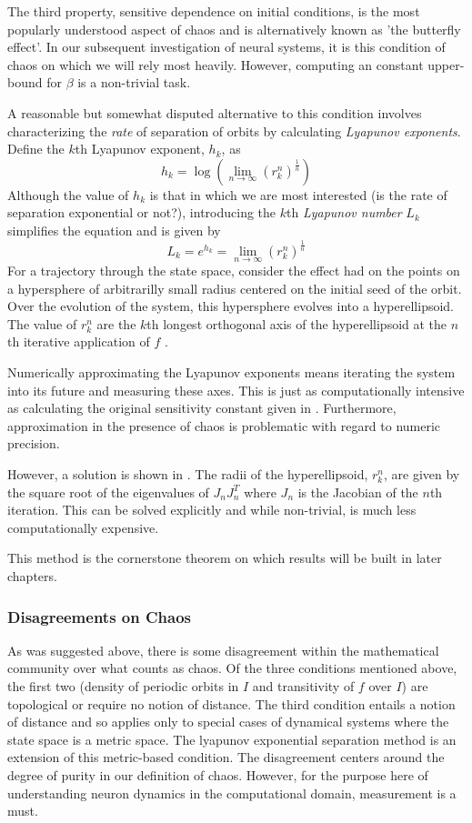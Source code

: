 \documentclass{elsart}
\begin{document}
The third property, sensitive dependence on initial conditions, is the most
popularly understood aspect of chaos and is alternatively known as
'the butterfly effect'.  In our subsequent investigation of neural systems,
it is this condition of chaos on which we will rely most heavily.  However,
computing an constant upper-bound for $\beta$ is a non-trivial task.

A reasonable but somewhat disputed alternative to this condition 
involves characterizing the \textit{rate} of
separation of orbits by calculating \textit{Lyapunov exponents}.
Define the $k$th Lyapunov exponent, $h_{k}$, as
$$h_{k} = \log \left( \lim \limits_{n \to \infty} (r_{k}^{n})^{\frac{1}{n}}\right)$$
Although the value of $h_{k}$ is that in which we are most interested (is the rate of separation exponential or not?), introducing the $k$th \textit{Lyapunov number} $L_{k}$ simplifies the equation and is given by
$$L_{k} = e^{h_{k}} = \lim \limits_{n \to \infty} (r_{k}^{n})^{\frac{1}{n}}$$
For a trajectory through the state space, consider the effect had on the points on a hypersphere of arbitrarilly small radius centered on the initial seed of 
the orbit.  Over the evolution of the system, this hypersphere evolves into
a hyperellipsoid.
The value of $r_{k}^{n}$ are the $k$th longest orthogonal axis of the hyperellipsoid at the $n$th iterative application of $f$ \cite{alligood, lyapunov, verstraeten}.

Numerically approximating the Lyapunov exponents means iterating the system
into its future and measuring these axes.  This is just as computationally
intensive as calculating the original sensitivity constant given in \cite{hirsch}.  Furthermore, approximation in the presence of chaos
is problematic with regard to numeric precision.

However, a solution is shown in \cite{alligood}.
The radii of the hyperellipsoid, $r_{k}^{n}$, are given by the
square root of the eigenvalues of $J_{n}J_{n}^{T}$ where $J_{n}$ is the 
Jacobian of the $n$th iteration.  This can be solved explicitly and
while non-trivial, is much less computationally expensive.

This method is the cornerstone theorem on which results will be built in later
chapters.


\subsubsection{Disagreements on Chaos}
As was suggested above, there is some disagreement within the 
mathematical community over what counts as chaos.  Of the three conditions
mentioned above, the first two (density of periodic orbits in $I$ and
transitivity of $f$ over $I$) are topological or require no notion of
distance.  The third condition entails a notion of distance 
and so applies only to special cases of dynamical systems where the 
state space is a metric space.  The lyapunov exponential separation
method is an extension of this metric-based condition.  The disagreement
centers around the degree of purity in our definition of chaos.  However,
for the purpose here of understanding neuron dynamics in the computational
domain, measurement is a must.  
\end{document}
